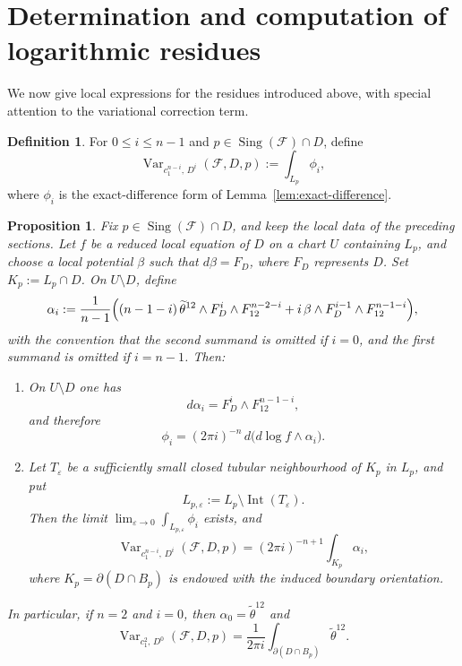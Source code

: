 \documentclass[12pt,reqno,a4paper]{amsart}
\numberwithin{equation}{section}
\theoremstyle{plain}
\newtheorem{proposition}[proposition]{Proposition}
\theoremstyle{definition}
\newtheorem{definition}[definition]{Definition}
\DeclareMathOperator{\Sing}{Sing}
\DeclareMathOperator{\Var}{Var}
\newcommand{\cF}{\mathcal{F}}
\begin{document}
 
\section{Determination and computation of logarithmic residues}

We now give local expressions for the residues introduced above, with special
attention to the variational correction term.

\begin{definition} \label{def:var-residue}
For \(0\leq i\leq n-1\) and \(p\in \Sing(\cF)\cap D\), define
\[
\Var_{c_1^{n-i},\,D^i}(\cF,D,p)
:=
\int_{L_p}\phi_i,
\]
where \(\phi_i\) is the exact-difference form of
Lemma~\ref{lem:exact-difference}.
\end{definition}

\begin{proposition}\label{prop:var-circle}
Fix \(p\in \Sing(\cF)\cap D\), and keep the local data of the preceding
sections. Let \(f\) be a reduced local equation of \(D\) on a chart \(U\)
containing \(L_p\), and choose a local potential \(\beta\) such that
\(d\beta=F_D\), where \(F_D\) represents \(D\). Set \(K_p:=L_p\cap D\). On
\(U\setminus D\), define
\[
\alpha_i
:=
\frac{1}{n-1}\Bigl(
(n-1-i)\,\widetilde{\theta}^{12}\wedge F_D^i\wedge F_{12}^{n-2-i}
+
i\,\beta\wedge F_D^{i-1}\wedge F_{12}^{n-1-i}
\Bigr),
\]
with the convention that the second summand is omitted if \(i=0\), and the
first summand is omitted if \(i=n-1\). Then:
\begin{enumerate}
\item[\textup{(a)}] On \(U\setminus D\) one has
\[
d\alpha_i=F_D^i\wedge F_{12}^{n-1-i},
\]
and therefore
\[
\phi_i=(2\pi i)^{-n}\,d\bigl(d\log f\wedge \alpha_i\bigr).
\]

\item[\textup{(b)}] Let \(T_\varepsilon\) be a sufficiently small closed tubular
neighbourhood of \(K_p\) in \(L_p\), and put
\[
L_{p,\varepsilon}:=L_p\setminus \operatorname{Int}(T_\varepsilon).
\]
Then the limit \(\lim_{\varepsilon\to 0}\int_{L_{p,\varepsilon}}\phi_i\)
exists, and
\[
\Var_{c_1^{n-i},\,D^i}(\cF,D,p)
=
(2\pi i)^{-n+1}\int_{K_p}\alpha_i,
\]
where \(K_p=\partial(D\cap B_p)\) is endowed with the induced boundary
orientation.
\end{enumerate}
In particular, if \(n=2\) and \(i=0\), then
\(\alpha_0=\widetilde{\theta}^{12}\) and
\[
\Var_{c_1^2,\,D^0}(\cF,D,p)
=
\frac{1}{2\pi i}\int_{\partial(D\cap B_p)}
\widetilde{\theta}^{12}.
\]
\end{proposition}
\end{document}
